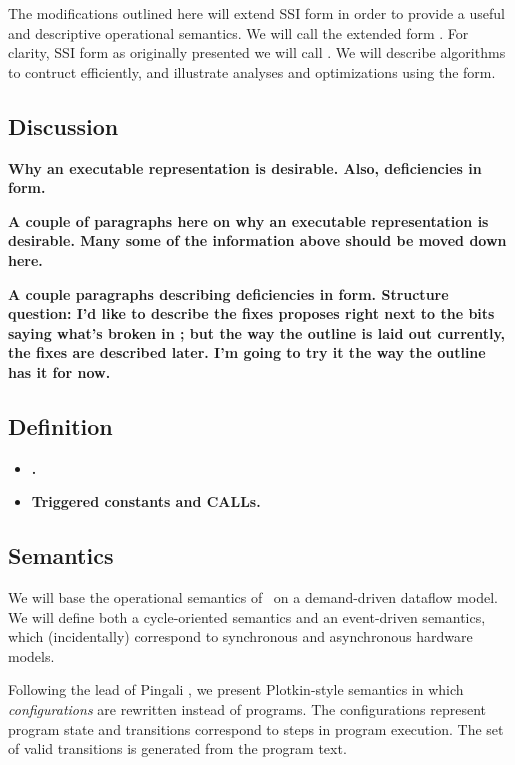 \documentclass[12pt,titlepage,twoside]{article}
\begin{document}
The modifications outlined here will extend SSI form in order to
provide a useful and descriptive operational semantics.  We will call
the extended form \ssiplus.  For clarity, SSI form as originally
presented we will call \ssizero.  We will describe algorithms to
contruct \ssiplus{} efficiently, and illustrate analyses and
optimizations using the form.

\subsection{Discussion}
\textbf{Why an executable representation is desirable.  Also,
deficiencies in \ssizero{} form.}

\textbf{A couple of paragraphs here on why an executable
representation is desirable.  Many some of the information above
should be moved down here.}

\textbf{A couple paragraphs describing deficiencies in \ssizero{} form.
Structure question: I'd like to describe the fixes \ssiplus{} proposes
right next to the bits saying what's broken in \ssizero{}; but the way
the outline is laid out currently, the fixes are described later.  I'm
going to try it the way the outline has it for now.}

\subsection{Definition}
\begin{itemize}
\item \textbf{.}
\item \textbf{Triggered constants and CALLs.}
\end{itemize}

\subsection{Semantics}\label{sec:semantics}
We will base the operational semantics of \ssiplus\ on a demand-driven
dataflow model.  We will define both a cycle-oriented semantics and an
event-driven semantics, which (incidentally) correspond to synchronous
and asynchronous hardware models.

Following the lead of Pingali \cite{pingali90:dfg}, we present Plotkin-style
semantics \cite{plotkin81:opsem} in which \emph{configurations} are
rewritten instead of programs.  The configurations represent program
state and transitions correspond to steps in program execution.  The
set of valid transitions is generated from the program text.
\end{document}
